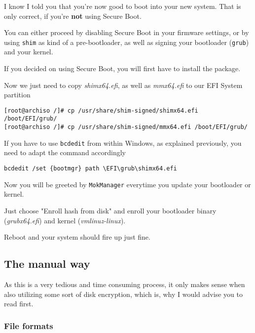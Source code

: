 \documentclass[10pt]{dustdoc}
\begin{document}
I know I told you that you’re now good to boot into your new system.
That is only correct, if you’re \textbf{not} using Secure Boot.

You can either proceed by disabling Secure Boot in your firmware settings, or by using \texttt{shim} as kind of a pre-bootloader, as well as signing your bootloader (\texttt{grub}) and your kernel.

If you decided on using Secure Boot, you will first have to install the package.

Now we just need to copy \textit{shimx64.efi}, as well as \textit{mmx64.efi} to our EFI System partition

\begin{verbatim}
[root@archiso /]# cp /usr/share/shim-signed/shimx64.efi /boot/EFI/grub/
[root@archiso /]# cp /usr/share/shim-signed/mmx64.efi /boot/EFI/grub/
\end{verbatim}

\begin{NOTE}
    If you have to use \texttt{bcdedit} from within Windows, as explained previously, you need to adapt the command accordingly

    \begin{verbatim}
bcdedit /set {bootmgr} path \EFI\grub\shimx64.efi
    \end{verbatim}
\end{NOTE}

Now you will be greeted by \texttt{MokManager} everytime you update your bootloader or kernel.

Just choose "Enroll hash from disk" and enroll your bootloader binary (\textit{grubx64.efi}) and kernel (\textit{vmlinuz-linux}).

Reboot and your system should fire up just fine.

\subsection{The manual way}
\label{sec:the-manual-way}

\begin{WARNING}
    As this is a very tedious and time consuming process, it only makes sense when also utilizing some sort of disk encryption, which is, why I would advise you to read  first.
\end{WARNING}

\subsubsection{File formats}
\label{sec:file-formats}
\end{document}

